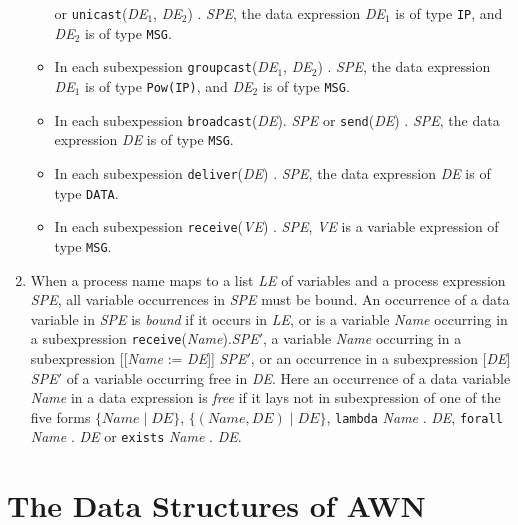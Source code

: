 \documentclass[adraft]{eptcs}
\newcommand{\aac}[1]{{\tt #1}}    %
\begin{document}
\begin{enumerate}
\begin{itemize}
    or  \aac{unicast}(\textit{DE}$_1$, \textit{DE}$_2$) . \textit{SPE},
    the data expression \textit{DE}$_1$ is of type {\tt IP}, and \textit{DE}$_2$ is of type {\tt MSG}.
  \item In each subexpession \aac{groupcast}(\textit{DE}$_1$, \textit{DE}$_2$) . \textit{SPE}, the data expression
    \textit{DE}$_1$ is of type {\tt Pow(IP)}, and \textit{DE}$_2$ is of type {\tt MSG}.
  \item In each subexpession \aac{broadcast}(\textit{DE}). \textit{SPE} or \aac{send}(\textit{DE}) . \textit{SPE},
    the data expression \textit{DE} is of type {\tt MSG}.
  \item In each subexpession \aac{deliver}(\textit{DE}) . \textit{SPE},  the data expression \textit{DE} is of type {\tt DATA}.
  \item In each subexpession \aac{receive}(\textit{VE}) . \textit{SPE}, \textit{VE} is a  variable
    expression of type {\tt MSG}.
  \end{itemize}
\item When a process name maps to a list \textit{LE} of variables and a process expression
  \textit{SPE}, all variable occurrences in \textit{SPE} must be bound.
  An occurrence of a data variable in \textit{SPE} is \emph{bound} if it occurs in \textit{LE}, or is
  a variable \textit{Name} occurring in a subexpression
  \aac{receive}(\textit{Name}).\textit{SPE}$'$, a variable \textit{Name} occurring in a subexpression
  [[\textit{Name} := \textit{DE}]] \textit{SPE}$'$, or an occurrence in a
  subexpression [\textit{DE}] \textit{SPE}$'$ of a variable occurring free in \textit{DE}.
  Here an occurrence  of a data variable \textit{Name} in a data expression is \emph{free} if it
  lays not in subexpression of one of the five forms  $\{\textit{Name}\mid \textit{DE}\}$,
  $\{(\textit{Name},\textit{DE})\mid \textit{DE}\}$,
                \aac{lambda} \textit{Name} . \textit{DE},
                \aac{forall} \textit{Name} . \textit{DE} or \aac{exists} \textit{Name} . \textit{DE}.
\end{enumerate}


\section{The Data Structures of AWN}
\end{document}
